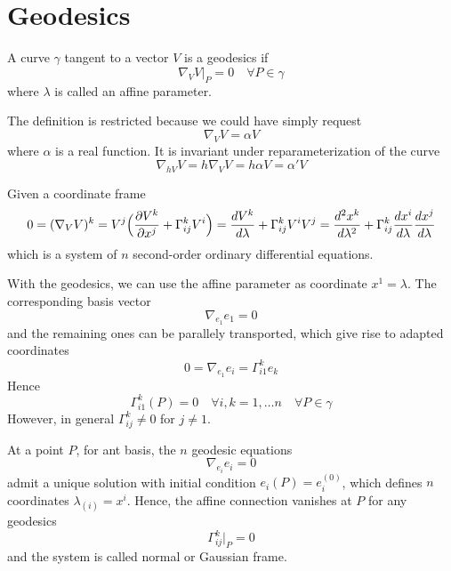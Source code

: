 \section{Geodesics}

    \begin{definition}[Geodesics]
        A curve $\gamma$ tangent to a vector $V$ is a geodesics if 
        \begin{equation*}
            \nabla_V V \vert_P = 0 \quad \forall P \in \gamma
        \end{equation*}
        where $\lambda$ is called an affine parameter. 
    \end{definition}

    The definition is restricted because we could have simply request 
    \begin{equation*}
        \nabla_V V = \alpha V
    \end{equation*}
    where $\alpha$ is a real function. It is invariant under reparameterization of the curve 
    \begin{equation*}
        \nabla_{h V} V = h \nabla_V V = h \alpha V = \alpha' V
    \end{equation*}

    Given a coordinate frame 
    \begin{equation*}
        0 = (\nabla_V V)^k = V^j \Big( \frac{\partial V^k}{\partial x^j} + \Gamma^k_{ij} V^i \Big) = \frac{dV^k}{d\lambda} + \Gamma^k_{ij} V^i V^j = \frac{d^2x^k}{d\lambda^2} + \Gamma^k_{ij} \frac{dx^i}{d\lambda} \frac{dx^j}{d\lambda}
    \end{equation*}
    which is a system of $n$ second-order ordinary differential equations. 

    With the geodesics, we can use the affine parameter as coordinate $x^1 = \lambda$. The corresponding basis vector
    \begin{equation*}
        \nabla_{e_1} e_1 = 0
    \end{equation*}
    and the remaining ones can be parallely transported, which give rise to adapted coordinates 
    \begin{equation*}
        0 = \nabla_{e_1} e_i = \Gamma^k_{i1} e_k
    \end{equation*}
    Hence 
    \begin{equation*}
        \Gamma^k_{i1}(P) = 0 \quad \forall i,k = 1, \ldots n \quad \forall P \in \gamma
    \end{equation*}
    However, in general $\Gamma^k_{ij} \neq 0$ for $j \neq 1$.

    At a point $P$, for ant basis, the $n$ geodesic equations 
    \begin{equation*}
        \nabla_{e_i} e_i = 0
    \end{equation*}
    admit a unique solution with initial condition $e_i(P) = e_i^{(0)}$, which defines $n$ coordinates $\lambda_{(i)} = x^i$. Hence, the affine connection vanishes at $P$ for any geodesics 
    \begin{equation*}
        \Gamma^k_{ij} \vert_P = 0
    \end{equation*}
    and the system is called normal or Gaussian frame.

